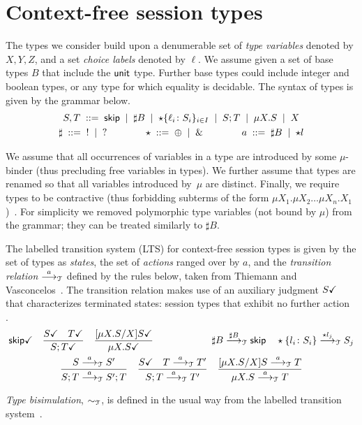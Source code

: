 \section{Context-free session types}
\label{sec:contextfreesession}

The types we consider build upon a denumerable set of \emph{type
  variables} denoted by $X,Y,Z$, and a set \emph{choice labels}
denoted by $\ell$. We assume given a set of base types $B$ that
include the $\unitk$ type. Further base types could include integer
and boolean types, or any type for which equality is decidable. The
syntax of types is given by the grammar below.
%
\begin{gather*}
  S,T \grmeq \skipk \grmor \sharp B \grmor 
  \star\{\ell_i\colon S_i\}_{i\in I} \grmor S;T \grmor \mu X.S \grmor X
  \\
  \sharp \grmeq {}! \grmor {}? 
  \qquad \qquad
  \star  \grmeq \oplus \grmor {}\&
  \qquad \qquad
  a \grmeq \sharp B \grmor \star l %
\end{gather*}

We assume that all occurrences of variables in a type are introduced
by some $\mu$-binder (thus precluding free variables in types).
%
We further assume that types are renamed so that all variables
introduced by~$\mu$ are distinct.
%
Finally, we require types to be contractive (thus forbidding subterms
of the form
$\mu X_1.\mu X_2 \dots \mu
X_n. X_1$)~\cite{DBLP:journals/tcs/Courcelle83,thiemann2016context}.
%
For simplicity we removed polymorphic type variables (not bound by
$\mu$) from the grammar; they can be treated similarly to $\sharp B$.

The labelled transition system (LTS) for context-free session types is
given by the set of types as \emph{states}, the set of \emph{actions}
ranged over by $a$, and the \emph{transition relation} $\LTSderives$
defined by the rules below, taken from Thiemann and
Vasconcelos~\cite{thiemann2016context}.  The transition relation makes
use of an auxiliary judgment $\DONE{S}$ that characterizes terminated
states: session types that exhibit no further
action~\cite{DBLP:journals/jacm/AcetoH92} .
%
\begin{gather*}
  \DONE{\skipk}
  \quad
  \frac{\DONE{S} \quad \DONE{T}}{\DONE{S; T}}
  \quad
  \frac{\DONE{\subs{\mu X.S}{X} S}}{\DONE{\mu X.S}}
  \qquad \qquad \qquad
  \sharp B \LTSderives[\sharp B] \skipk
  \quad
  \star\{l_i\colon S_i\} \LTSderives[\star l_j] S_j
  \\
  \frac{S \LTSderives S'}{S; T \LTSderives S';T}
  \quad
  \frac{\DONE{S} \quad T \LTSderives T'}{S; T \LTSderives T'}
  \quad
  \frac{\subs{\mu X.S}{X}S \LTSderives T}{\mu X.S \LTSderives T}
\end{gather*}

\emph{Type bisimulation}, $\TypeEquiv$, is defined in the usual way from the
labelled transition system~\cite{sangiorgi2014introduction}.
\
